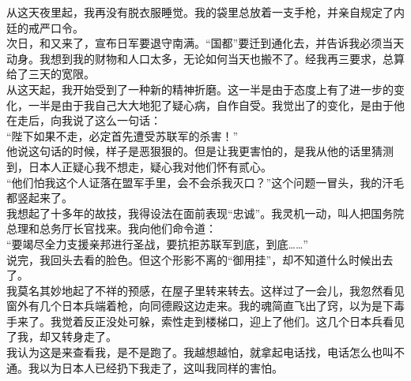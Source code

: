 从这天夜里起，我再没有脱衣服睡觉。我的袋里总放着一支手枪，并亲自规定了内廷的戒严口令。\\

次日，和又来了，宣布日军要退守南满。“国都”要迁到通化去，并告诉我必须当天动身。我想到我的财物和人口太多，无论如何当天也搬不了。经我再三要求，总算给了三天的宽限。\\

从这天起，我开始受到了一种新的精神折磨。这一半是由于态度上有了进一步的变化，一半是由于我自己大大地犯了疑心病，自作自受。我觉出了的变化，是由于他在走后，向我说了这么一句话：\\

“陛下如果不走，必定首先遭受苏联军的杀害！”\\

他说这句话的时候，样子是恶狠狠的。但是让我更害怕的，是我从他的话里猜测到，日本人正疑心我不想走，疑心我对他们怀有贰心。\\

“他们怕我这个人证落在盟军手里，会不会杀我灭口？”这个问题一冒头，我的汗毛都竖起来了。\\

我想起了十多年的故技，我得设法在面前表现“忠诚”。我灵机一动，叫人把国务院总理和总务厅长官找来。我向他们命令道：\\

“要竭尽全力支援亲邦进行圣战，要抗拒苏联军到底，到底……”\\

说完，我回头去看的脸色。但这个形影不离的“御用挂”，却不知道什么时候出去了。\\

我莫名其妙地起了不祥的预感，在屋子里转来转去。这样过了一会儿，我忽然看见窗外有几个日本兵端着枪，向同德殿这边走来。我的魂简直飞出了窍，以为是下毒手来了。我觉着反正没处可躲，索性走到楼梯口，迎上了他们。这几个日本兵看见了我，却又转身走了。\\

我认为这是来查看我，是不是跑了。我越想越怕，就拿起电话找，电话怎么也叫不通。我以为日本人已经扔下我走了，这叫我同样的害怕。\\

